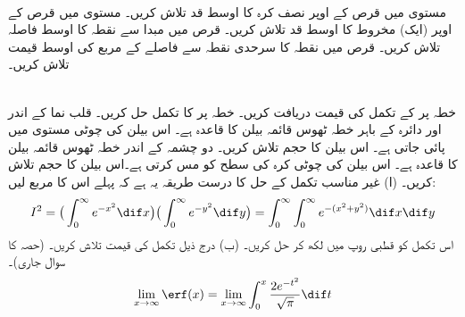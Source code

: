 \\
مستوی  میں قرص   کے اوپر نصف کرہ   کا اوسط قد تلاش کریں۔
مستوی  میں قرص  کے اوپر (ایک)  مخروط   کا اوسط قد تلاش کریں۔ 
قرص  میں مبدا سے نقطہ  کا  اوسط  فاصلہ تلاش کریں۔
قرص  میں نقطہ  کا سرحدی نقطہ  سے  فاصلے کے مربع   کی اوسط  قیمت تلاش کریں۔

\\
خطہ  پر    کے تکمل کی قیمت  دریافت کریں۔
\wf{\unexpanded{
$2\pi$
}}
خطہ  پر  کا تکمل حل کریں۔
قلب نما  کے اندر اور دائرہ  کے باہر خطہ ٹھوس قائمہ بیلن کا قاعدہ ہے۔ اس بیلن کی چوٹی مستوی  میں پائی جاتی  ہے۔ اس بیلن کا حجم تلاش کریں۔ 
دو چشمہ  کے اندر خطہ ٹھوس قائمہ بیلن کا قاعدہ ہے۔ اس بیلن کی چوٹی کرہ  کی سطح  کو مس کرتی ہے۔اس بیلن کا حجم تلاش کریں۔ 
(ا) غیر مناسب تکمل   کے حل کا درست طریقہ یہ ہے کہ پہلے اس کا مربع لیں:
\begin{align*}
I^2=\big(\int_0^{\infty}e^{-x^2}\dif x\big)\big(\int_0^{\infty}e^{-y^2}\dif y\big)=\int_0^{\infty}\int_0^{\infty}e^{-(x^2+y^2)}\dif x\dif y
\end{align*}
اس تکمل کو قطبی روپ میں لکھ کر حل کریں۔  (ب) درج ذیل تکمل  کی قیمت تلاش کریں۔  (حصہ  کا سوال  جاری)۔
\begin{align*}
\lim_{x\to\infty}\erf(x)=\lim_{x\to \infty}\int_0^{x}\frac{2e^{-t^2}}{\sqrt{\pi}}\dif t
\end{align*}
